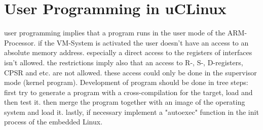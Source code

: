 \section{User Programming in uCLinux}
\bi
	\ite user programming implies that a program runs in the user mode of the ARM-Processor.
	\ite if the VM-System is activated \pr the user doesn't have an access to an absolute memory address.
	\bi
		\ite especially a direct access to the registers of interfaces isn't allowed.
	\ei
	\bigskip
	\ite the restrictions imply also that an access to R-, S-, D-registers, CPSR and etc. are not allowed.
	\ite these access could only be done in the supervisor mode (kernel program).
\ei
\bigskip
\bi
	\ite Development of program should be done in tree steps:
	\bi
           \ite first try to generate a program with a cross-compilation for the target, load and then test it.
	      \ite then merge the program together with an image of the operating system and load it.
	      \ite lastly, if necessary implement a "autoexec" function in the init process of the embedded Linux.
      \ei
\ei
